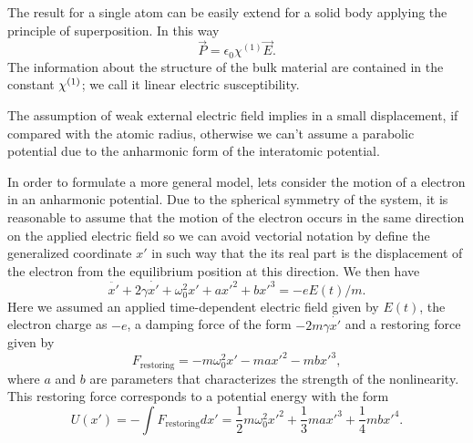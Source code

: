 The result for a single atom can be easily extend for a solid body applying the principle of  superposition. In this way
\begin{equation}
    \vec{P} = \epsilon_0\chi^{(1)}\vec{E}.
\end{equation}
The information about the structure of the bulk material are contained in the constant $\chi^{( 1)}$; we call it linear electric susceptibility.

The assumption of weak external electric field implies in a small displacement, if compared with the atomic radius, otherwise we can't assume a parabolic potential due to the anharmonic form of the interatomic potential. 

In order to formulate a more general model, lets consider the motion of a electron in an anharmonic potential. Due to the spherical symmetry of the system, it is reasonable to assume that the motion of the electron occurs in the same direction on the applied electric field so we can avoid vectorial notation by define the generalized coordinate $x'$ in such way that the its real part is the displacement of the electron from the equilibrium position at this direction. We then have
\begin{equation}
    \ddot{x'} + 2\gamma\dot{x'} + \omega_0^2x'+ax'^2+bx'^3 = -eE(t)/m.
    \label{eq:motion_equation_electron}
\end{equation}
Here we assumed an applied time-dependent electric field given by $E(t)$, the electron charge as $-e$, a damping force of the form $-2m\gamma\dot{x'}$ and a restoring force given by
\begin{equation}
    F_\text{restoring} = -m\omega_0^2x' -max'^2 -mbx'^3, 
\end{equation}
where $a$ and $b$ are parameters that characterizes the strength of the nonlinearity. This restoring force corresponds to a potential energy with the form 
\begin{equation}
    U(x') = -\int F_\text{restoring} dx' = \frac{1}{2}m\omega_0^2x'^2 +\frac{1}{3}max'^3 +\frac{1}{4}mbx'^4.
\end{equation}

